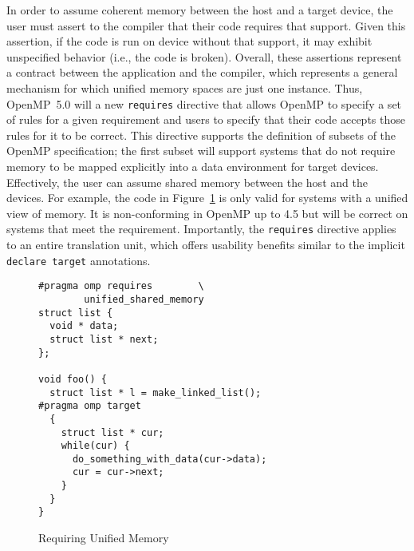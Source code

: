 In order to assume coherent memory between the host and a target device, 
the user must assert to the compiler that their code requires that support.
Given this assertion, if the code is run on device without that support, 
it may exhibit unspecified behavior (i.e., the code is broken). Overall,
these assertions represent a contract between the application and the 
compiler, which represents a general mechanism for which unified memory
spaces are just one instance. Thus, OpenMP~5.0 will a new \texttt{requires} 
directive that allows OpenMP to specify a set of rules for a given 
requirement and users to specify that their code accepts those rules for
it to be correct. This directive supports the definition of subsets of 
the OpenMP specification; the first subset will support systems that do 
not require memory to be mapped explicitly into a data environment for 
target devices. Effectively, the user can assume shared memory between
the host and the devices. For example, the code in Figure~\ref{fig:unified} 
is only valid for systems with a unified view of memory. It is non-conforming 
in OpenMP up to 4.5 but will be correct on systems that meet the requirement.
Importantly, the \texttt{requires} directive applies to an entire translation
unit, which offers usability benefits similar to the implicit 
\texttt{declare target} annotations.

\begin{figure}
\begin{verbatim}
#pragma omp requires        \
        unified_shared_memory
struct list {
  void * data;
  struct list * next;
};

void foo() {
  struct list * l = make_linked_list();
#pragma omp target
  {
    struct list * cur;
    while(cur) {
      do_something_with_data(cur->data);
      cur = cur->next;
    }
  }
}
\end{verbatim}
\caption{Requiring Unified Memory\label{fig:unified}}
\end{figure}

